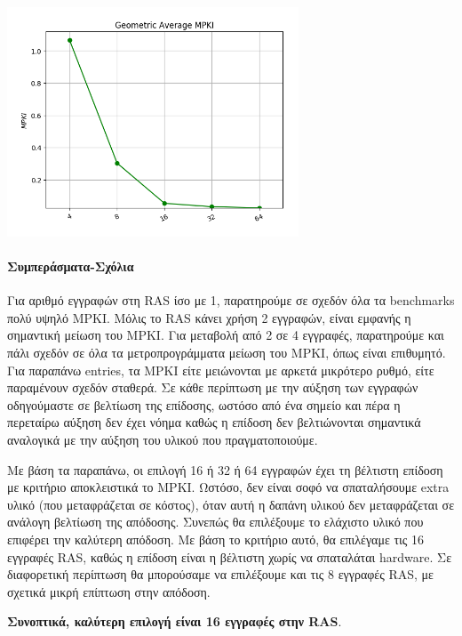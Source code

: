    \begin{minipage}{\textwidth}
      \begin{center}
         \\
         \vspace{3mm}
         \includegraphics[width=0.65\textwidth, frame]{./graphs/4-4/mean.png}
         \vspace{6mm}
      \end{center}
   \end{minipage}

\paragraph{Συμπεράσματα-Σχόλια}
   

   Για αριθμό εγγραφών στη RAS ίσο με 1, παρατηρούμε σε σχεδόν όλα τα benchmarks
   πολύ υψηλό MPKI. Μόλις το RAS κάνει χρήση 2 εγγραφών, είναι εμφανής η
   σημαντική μείωση του MPKI. Για μεταβολή από 2 σε 4 εγγραφές, παρατηρούμε και
   πάλι σχεδόν σε όλα τα μετροπρογράμματα μείωση του MPKI, όπως είναι επιθυμητό.
   Για παραπάνω entries, τα MPKI είτε μειώνονται με αρκετά μικρότερο ρυθμό, είτε
   παραμένουν σχεδόν σταθερά. Σε κάθε περίπτωση με την αύξηση των εγγραφών οδηγούμαστε
   σε βελτίωση της επίδοσης, ωστόσο από ένα σημείο και πέρα η περεταίρω αύξηση
   δεν έχει νόημα καθώς η επίδοση δεν βελτιώνονται σημαντικά αναλογικά με την
   αύξηση του υλικού που πραγματοποιούμε. 

   Με βάση τα παραπάνω, οι επιλογή 16 ή 32 ή 64 εγγραφών έχει τη βέλτιστη
   επίδοση με κριτήριο αποκλειστικά το MPKI. Ωστόσο, δεν είναι σοφό να
   σπαταλήσουμε extra υλικό (που μεταφράζεται σε κόστος), όταν αυτή η δαπάνη
   υλικού δεν μεταφράζεται σε ανάλογη βελτίωση της απόδοσης. Συνεπώς θα
   επιλέξουμε το ελάχιστο υλικό που επιφέρει την καλύτερη απόδοση. Με βάση το
   κριτήριο αυτό, θα επιλέγαμε τις 16 εγγραφές RAS, καθώς η επίδοση είναι η
   βέλτιστη χωρίς να σπαταλάται hardware. Σε διαφορετική περίπτωση θα μπορούσαμε 
   να επιλέξουμε και τις 8 εγγραφές RAS, με σχετικά μικρή επίπτωση στην απόδοση.
   
   \textbf{Συνοπτικά, καλύτερη επιλογή είναι 16 εγγραφές στην RAS}.